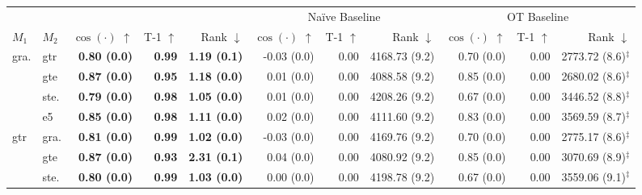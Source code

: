 \begin{table}[!b]
    \scriptsize
    \centering
    \begin{tabular}{llrrrrrrrrr}
        \toprule
        \multicolumn{2}{c}{} & \multicolumn{3}{c}{\atk{}} & \multicolumn{3}{c}{Naïve Baseline} & \multicolumn{3}{c}{OT Baseline}\\
        \cmidrule(lr){3-5} \cmidrule(lr){6-8}  \cmidrule(lr){9-11} 
        $M_1$ & $M_2$ & $\cos(\cdot)$ $\uparrow$ & T-1 $\uparrow$ & Rank $\downarrow$ & $\cos(\cdot)$ $\uparrow$ & T-1 $\uparrow$ & Rank $\downarrow$ &  $\cos(\cdot)$ $\uparrow$ & T-1 $\uparrow$ & Rank $\downarrow$\\
        \midrule
        \multirow{4}{*}{gra.} & gtr & \textbf{0.80 {\tiny (0.0)}} & \textbf{0.99} & \textbf{1.19 {\tiny (0.1)}} & -0.03 {\tiny (0.0)} & 0.00 & 4168.73 {\tiny (9.2)} & 0.70 {\tiny (0.0)} & 0.00 & 2773.72 {\tiny (8.6)}$^{\ddagger}$ \\
        & gte & \textbf{0.87 {\tiny (0.0)}} & \textbf{0.95} & \textbf{1.18 {\tiny (0.0)}} & 0.01 {\tiny (0.0)} & 0.00 & 4088.58 {\tiny (9.2)} & 0.85 {\tiny (0.0)} & 0.00 & 2680.02 {\tiny (8.6)}$^{\ddagger}$ \\
        & ste. & \textbf{0.79 {\tiny (0.0)}} & \textbf{0.98} & \textbf{1.05 {\tiny (0.0)}} & 0.01 {\tiny (0.0)} & 0.00 & 4208.26 {\tiny (9.2)} & 0.67 {\tiny (0.0)} & 0.00 & 3446.52 {\tiny (8.8)}$^{\ddagger}$ \\
        & e5 & \textbf{0.85 {\tiny (0.0)}} & \textbf{0.98} & \textbf{1.11 {\tiny (0.0)}} & 0.02 {\tiny (0.0)} & 0.00 & 4111.60 {\tiny (9.2)} & 0.83 {\tiny (0.0)} & 0.00 & 3569.59 {\tiny (8.7)}$^{\ddagger}$ \\
        \midrule
        \multirow{4}{*}{gtr} & gra. & \textbf{0.81 {\tiny (0.0)}} & \textbf{0.99} & \textbf{1.02 {\tiny (0.0)}} & -0.03 {\tiny (0.0)} & 0.00 & 4169.76 {\tiny (9.2)} & 0.70 {\tiny (0.0)} & 0.00 & 2775.17 {\tiny (8.6)}$^{\ddagger}$ \\
        & gte & \textbf{0.87 {\tiny (0.0)}} & \textbf{0.93} & \textbf{2.31 {\tiny (0.1)}} & 0.04 {\tiny (0.0)} & 0.00 & 4080.92 {\tiny (9.2)} & 0.85 {\tiny (0.0)} & 0.00 & 3070.69 {\tiny (8.9)}$^{\ddagger}$ \\
        & ste. & \textbf{0.80 {\tiny (0.0)}} & \textbf{0.99} & \textbf{1.03 {\tiny (0.0)}} & 0.00 {\tiny (0.0)} & 0.00 & 4198.78 {\tiny (9.2)} & 0.67 {\tiny (0.0)} & 0.00 & 3559.06 {\tiny (9.1)}$^{\ddagger}$ \\

\end{tabular}
\end{table}
